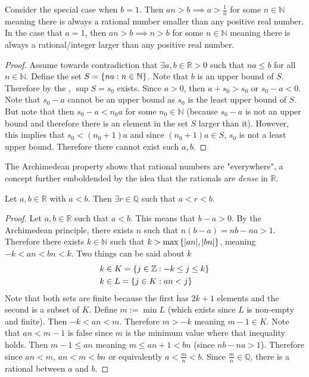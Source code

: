 \documentclass[../notes.tex]{subfiles}
\begin{document}
Consider the special case when $b = 1$. Then $an > b \implies a > \frac{1}{n}$ for some $n \in \mathbb{N}$ meaning there is always a rational number smaller than any positive real number. In the case that $a = 1$, then $an > b \implies n > b$ for some $n \in \mathbb{N}$ meaning there is always a rational/integer larger than any positive real number.

\begin{proof}
	Assume towards contradiction that $\exists a,b \in \mathbb{R} > 0$ such that $na \leq b$ for all $n \in \mathbb{N}$. Define the set $S = \qty{na : n \in \mathbb{N}}$. Note that $b$ is an upper bound of $S$. Therefore by the , $\sup S = s_0$ exists. Since $a > 0$, then $a + s_0 > s_0$ or $s_0 - a < 0$. Note that $s_0 - a$ cannot be an upper bound as $s_0$ is the least upper bound of $S$. But note that then $s_0 - a < n_0 a$ for some $n_0 \in \mathbb{N}$ (because $s_0 - a$ is not an upper bound and therefore there is an element in the set $S$ larger than it). However, this implies that $s_0 < (n_0 + 1)a$ and since $(n_0+1)a \in S$, $s_0$ is not a least upper bound. Therefore there cannot exist such $a,b$.
\end{proof}

The Archimedean property shows that rational numbers are "everywhere", a concept further emboldended by the idea that the rationals are \textit{dense} in $\mathbb{R}$.

\begin{theorem}
	Let $a,b \in \mathbb{R}$ with $a < b$. Then $\exists r \in \mathbb{Q}$ such that $a < r < b$.
\end{theorem}
\begin{proof}
	Let $a,b \in \mathbb{R}$ such that $a < b$. This means that $b - a > 0$. By the Archimedean principle, there exists $n$ such that $n(b-a) = nb - na > 1$. Therefore there exists $k \in \mathbb{N}$ such that $k > \operatorname{max}\qty{|an|, |bn|}$, meaning $-k < an < bn < k$. Two things can be said about $k$
	\begin{align*}
		k &\in K = \qty{j \in \mathbb{Z} : -k \leq j \leq k} \\
		k &\in L=  \qty{j \in K : an < j}
	\end{align*}
	Note that both sets are finite because the first has $2k + 1$ elements and the second is a subset of $K$. Define $m := \min{L}$ (which exists since $L$ is non-empty and finite). Then $-k < an < m$. Therefore $m > -k$ meaning $m - 1 \in K$. Note that $an < m - 1$ is false since $m$ is the minimum value where that inequality holds. Then $m - 1 \leq an$ meaning $m \leq an + 1 < bn$ (since $nb - na > 1$). Therefore since $an < m$, $an < m < bn$ or equivalently $a < \frac{m}{n} < b$. Since $\frac{m}{n} \in \mathbb{Q}$, there is a rational between $a$ and $b$.
\end{proof}
\end{document}
